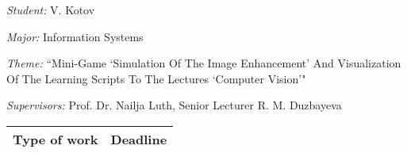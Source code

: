 \begin{titlepage}
\begin{centering}
		\vspace{12pt}
	\end{centering}

	\emph{Student:} V. Kotov

	\emph{Major:} Information Systems

	\emph{Theme:} ``Mini-Game `Simulation Of The Image Enhancement' And Visualization Of The Learning Scripts To The Lectures `Computer Vision'"

	\emph{Supervisors:} Prof. Dr. Nailja Luth, Senior Lecturer R. M. Duzbayeva

	\begin{centering}

		\begin{longtable}{|p{}|l|}
			\hline
			\textbf{Type of work} & \textbf{Deadline}\\
			\endhead

			\hline


\end{longtable}
\end{centering}
\end{titlepage}
